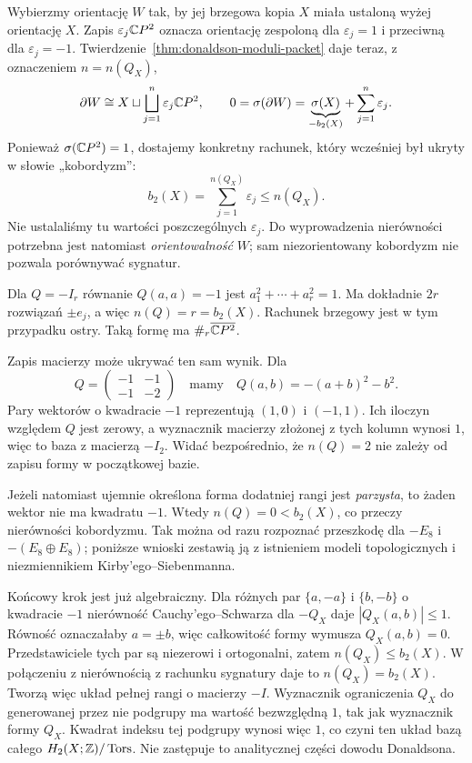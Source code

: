 Wybierzmy orientację $W$ tak, by jej brzegowa kopia
$X$ miała ustaloną wyżej orientację $X$.
Zapis $\varepsilon_j\mathbb{C} P^2$ oznacza orientację
zespoloną dla $\varepsilon_j=1$ i przeciwną dla
$\varepsilon_j=-1$.
Twierdzenie~\ref{thm:donaldson-moduli-packet} daje
teraz, z oznaczeniem $n=n(Q_X)$,
\[
 \partial W\cong X\sqcup
   \bigsqcup_{j=1}^{n}\varepsilon_j\mathbb{C} P^2,
 \qquad
 0=\sigma(\partial W)
   =\underbrace{\sigma(X)}_{-b_2(X)}
    +\sum_{j=1}^{n}\varepsilon_j.
\]
Ponieważ $\sigma(\mathbb{C} P^2)=1$, dostajemy konkretny
rachunek, który wcześniej był ukryty w słowie
„kobordyzm”:
\[
 b_2(X)=\sum_{j=1}^{n(Q_X)}\varepsilon_j
       \leq n(Q_X).
\]
Nie ustalaliśmy tu wartości poszczególnych
$\varepsilon_j$. Do wyprowadzenia nierówności
potrzebna jest natomiast \emph{orientowalność} $W$;
sam niezorientowany kobordyzm nie pozwala
porównywać sygnatur.

\begin{przyklad}
\label{prz:donaldson-reducibles-lattice}
Dla $Q=-I_r$ równanie $Q(a,a)=-1$ jest
$a_1^2+\cdots+a_r^2=1$. Ma dokładnie $2r$
rozwiązań $\pm e_j$, a więc $n(Q)=r=b_2(X)$.
Rachunek brzegowy jest w tym przypadku ostry.
Taką formę ma $\#_r\overline{\mathbb{C} P^2}$.

Zapis macierzy może ukrywać ten sam wynik.
Dla
\[
 Q=\begin{pmatrix}-1&-1\\-1&-2\end{pmatrix}
 \quad\text{mamy}\quad
 Q(a,b)=-(a+b)^2-b^2.
\]
Pary wektorów o kwadracie $-1$ reprezentują
$(1,0)$ i $(-1,1)$. Ich iloczyn względem $Q$
jest zerowy, a wyznacznik macierzy złożonej z tych
kolumn wynosi $1$, więc to baza z macierzą $-I_2$.
Widać bezpośrednio, że $n(Q)=2$ nie zależy od zapisu
formy w początkowej bazie.

Jeżeli natomiast ujemnie określona forma dodatniej
rangi jest \emph{parzysta}, to żaden wektor nie ma
kwadratu $-1$. Wtedy $n(Q)=0<b_2(X)$, co przeczy
nierówności kobordyzmu. Tak można od razu rozpoznać
przeszkodę dla $-E_8$ i $-(E_8\oplus E_8)$;
poniższe wnioski zestawią ją z istnieniem modeli
topologicznych i niezmiennikiem
Kirby'ego--Siebenmanna.
\end{przyklad}

Końcowy krok jest już algebraiczny. Dla różnych par
$\{a,-a\}$ i $\{b,-b\}$ o kwadracie $-1$ nierówność
Cauchy'ego--Schwarza dla $-Q_X$ daje
$|Q_X(a,b)|\leq1$. Równość oznaczałaby $a=\pm b$,
więc całkowitość formy wymusza $Q_X(a,b)=0$.
Przedstawiciele tych par są niezerowi i ortogonalni,
zatem $n(Q_X)\leq b_2(X)$. W połączeniu z nierównością
z rachunku sygnatury daje to $n(Q_X)=b_2(X)$.
Tworzą więc układ pełnej rangi o macierzy $-I$.
Wyznacznik ograniczenia $Q_X$ do generowanej przez
nie podgrupy ma wartość bezwzględną $1$, tak jak
wyznacznik formy $Q_X$. Kwadrat indeksu tej podgrupy
wynosi więc $1$, co czyni ten układ bazą całego
$H_2(X;\mathbb{Z})/\operatorname{Tors}$. Nie zastępuje to
analitycznej części dowodu Donaldsona.

